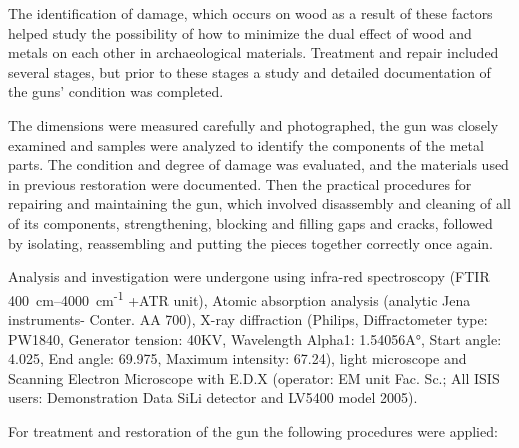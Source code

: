The identification of damage, which occurs on wood as a result of these factors helped study the possibility of how to minimize the dual effect of wood and metals on each other in archaeological materials. Treatment and repair included several stages, but prior to these stages a study and detailed documentation of the guns’ condition was completed. 

The dimensions were measured carefully and photographed, the gun was closely examined and samples were analyzed to identify the components of the metal parts. The condition and degree of damage was evaluated, and the materials used in previous restoration were documented. Then the practical procedures for repairing and maintaining the gun, which involved disassembly and cleaning of all of its components, strengthening, blocking and filling gaps and cracks, followed by isolating, reassembling and putting the pieces together correctly once again.



Analysis  and investigation were undergone using infra-red spectroscopy (FTIR \SIrange{400}{4000}{\centi\metre}\textsuperscript{-1} +ATR unit), Atomic absorption analysis (analytic Jena instruments- Conter. AA 700), X-ray diffraction (Philips, Diffractometer type: PW1840, Generator tension: 40KV, Wavelength Alpha1: 1.54056A°, Start angle: 4.025, End angle: 69.975, Maximum intensity: 67.24), light microscope and Scanning Electron Microscope with E.D.X (operator: EM unit Fac. Sc.; All ISIS users: Demonstration Data SiLi detector and LV5400 model 2005).


For  treatment and restoration of the gun the following procedures were applied:

